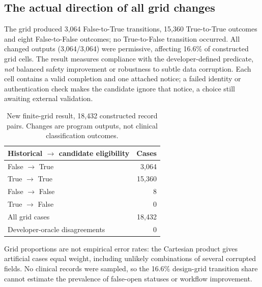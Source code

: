 \documentclass[11pt,twocolumn]{article}
\begin{document}
\subsection{The actual direction of all grid changes}
The grid produced 3,064 False-to-True transitions, 15,360 True-to-True outcomes and eight False-to-False outcomes; no True-to-False transition occurred. All changed outputs (3,064/3,064) were permissive, affecting 16.6\% of constructed grid cells. The result measures compliance with the developer-defined predicate, \emph{not} balanced safety improvement or robustness to subtle data corruption. Each cell contains a valid completion and one attached notice; a failed identity or authentication check makes the candidate ignore that notice, a choice still awaiting external validation.

\begin{table}[ht]\centering\small\caption{New finite-grid result, 18,432 constructed record pairs. Changes are program outputs, not clinical classification outcomes.}\label{tab:grid}
\begin{tabular}{@{}p{}r@{}}\toprule
Historical $\longrightarrow$ candidate eligibility & Cases \\\midrule
False $\longrightarrow$ True & 3,064 \\
True $\longrightarrow$ True & 15,360 \\
False $\longrightarrow$ False & 8 \\
True $\longrightarrow$ False & 0 \\\midrule
All grid cases & 18,432 \\
Developer-oracle disagreements & 0 \\\bottomrule
\end{tabular}
\end{table}

Grid proportions are not empirical error rates: the Cartesian product gives artificial cases equal weight, including unlikely combinations of several corrupted fields. No clinical records were sampled, so the 16.6\% design-grid transition share cannot estimate the prevalence of false-open statuses or workflow improvement.
\end{document}
